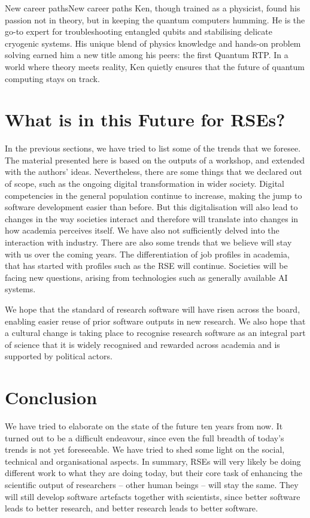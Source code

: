 \documentclass{eceasst}
\begin{document}
\begin{story}{New career paths}{New career paths}
Ken, though trained as a physicist, found his passion not in theory,
but in keeping the quantum computers humming. He is the go-to expert
for troubleshooting entangled qubits and stabilising delicate cryogenic systems.
His unique blend of physics knowledge and hands-on problem solving earned him
a new title among his peers: the first Quantum RTP.
In a world where theory meets reality, Ken quietly ensures that the future
of quantum computing stays on track.
\end{story}

\section{What is in this Future for RSEs?}
In the previous sections, we have tried to list some of the trends that we foresee.
The material presented here is based on the outputs of a workshop, and extended with the authors' ideas.
Nevertheless, there are some things that we declared out of scope, such as the ongoing digital transformation in wider society.
Digital competencies in the general population continue to increase,
making the jump to software development easier than before.
But this digitalisation will also lead to changes in the way societies
interact and therefore will translate into changes in how academia perceives itself.
We have also not sufficiently delved into the interaction with industry.
There are also some trends that we believe will stay with us over the coming years.
The differentiation of job profiles in academia, that has started with profiles such as the RSE will continue.
Societies will be facing new questions, arising from technologies such as generally available AI systems.

We hope that the standard of research software will have risen across the board,
enabling easier reuse of prior software outputs in new research.
We also hope that a cultural change is taking place to recognise research software
as an integral part of science that it is widely recognised and rewarded across
academia and is supported by political actors.

\section{Conclusion}
We have tried to elaborate on the state of the future ten years from now.
It turned out to be a difficult endeavour, since even the full breadth of today's trends is not yet foreseeable.
We have tried to shed some light on the social, technical and organisational aspects.
In summary, RSEs will very likely be doing different work to what they are doing today,
but their core task of enhancing the scientific output of researchers -- other human
beings -- will stay the same.
They will still develop software artefacts together with scientists,
since better software leads to better research,
and better research leads to better software.
\end{document}
